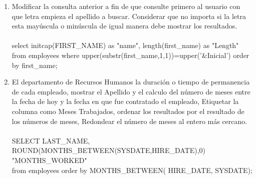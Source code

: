\begin{enumerate}[1.]
	\item Modificar la consulta anterior a fin de que consulte primero al usuario con que letra empieza el apellido a buscar. Considerar que no importa si la letra esta may\'uscula o min\'uscula de igual manera debe mostrar los resultados.
	\\
	\\select initcap(FIRST\_NAME) as "name", length(first\_name) as "Length" from employees where upper(substr(first\_name,1,1))=upper('\&Inicial') order by first\_name;

	\item El departamento de Recursos Humanos la duración o tiempo de permanencia de cada empleado, mostrar el Apellido y el calculo del número de meses entre la fecha de hoy y la fecha en que fue contratado el empleado, Etiquetar la columna como Meses Trabajados, ordenar los resultados por el resultado de los n\'umeros de meses, Redondear el número de meses al entero más cercano.
	\\
	\\SELECT LAST\_NAME, ROUND(MONTHS\_BETWEEN(SYSDATE,HIRE\_DATE),0) "MONTHS\_WORKED"
	\\from employees order by MONTHS\_BETWEEN( HIRE\_DATE, SYSDATE);


\end{enumerate}
